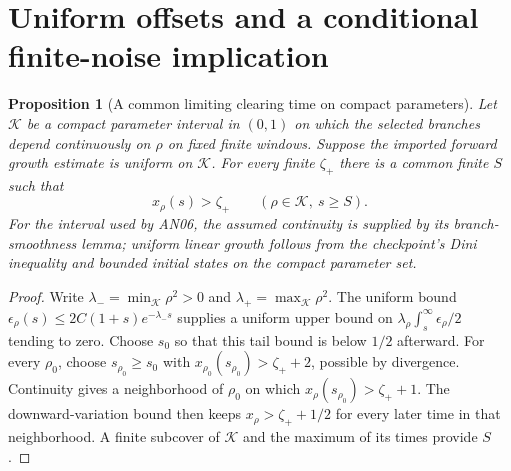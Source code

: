 \documentclass[11pt]{article}
\numberwithin{equation}{section}
\newtheorem{proposition}[theorem]{Proposition}
\theoremstyle{remark}\newtheorem{remark}[theorem]{Remark}
\begin{document}
\section{Uniform offsets and a conditional finite-noise implication}
\label{inc:LP:v1:transfer}
\begin{proposition}[A common limiting clearing time on compact parameters]
\label{inc:LP:v1:uniform-clear}
Let $\mathcal K$ be a compact parameter interval in $(0,1)$ on which the
selected branches depend continuously on $\rho$ on fixed finite windows.
Suppose the imported forward growth estimate is uniform on $\mathcal K$.
For every finite $\zeta_+$ there is a common finite $S$ such that
\[
 x_\rho(s)>\zeta_+\qquad(\rho\in\mathcal K,\ s\ge S).
\]
For the interval used by AN06, the assumed continuity is supplied by its
branch-smoothness lemma; uniform linear growth follows from the checkpoint's
Dini inequality and bounded initial states on the compact parameter set.
\end{proposition}
\begin{proof}
Write $\lambda_- =\min_{\mathcal K}\rho^2>0$ and
$\lambda_+=\max_{\mathcal K}\rho^2$. The uniform bound
$\epsilon_\rho(s)\le2C(1+s)e^{-\lambda_-s}$ supplies a uniform upper
bound on $\lambda_\rho\int_s^\infty\epsilon_\rho/2$ tending to zero.
Choose $s_0$ so that this tail bound is below $1/2$ afterward.
For every $\rho_0$, choose $s_{\rho_0}\ge s_0$ with
$x_{\rho_0}(s_{\rho_0})>\zeta_++2$, possible by divergence.
Continuity gives a neighborhood of $\rho_0$ on which
$x_\rho(s_{\rho_0})>\zeta_++1$. The downward-variation bound then keeps
$x_\rho>\zeta_++1/2$ for every later time in that neighborhood. A finite
subcover of $\mathcal K$ and the maximum of its times provide $S$.
\end{proof}
\end{document}
